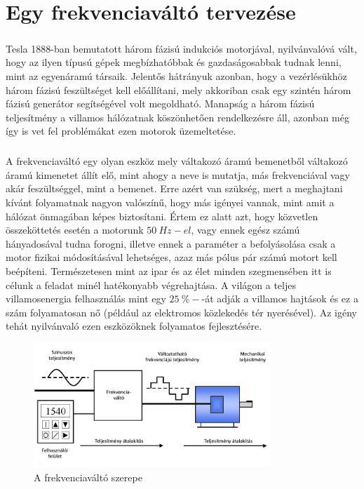 \chapter{Egy frekvenciaváltó tervezése}

\paragraph{}
Tesla 1888-ban bemutatott három fázisú indukciós motorjával, nyilvánvalóvá vált, hogy az ilyen típusú gépek megbízhatóbbak és gazdaságosabbak tudnak lenni, mint az egyenáramú társaik. Jelentős hátrányuk azonban, hogy a vezérlésükhöz három fázisú feszültséget kell előállítani, mely akkoriban csak egy szintén három fázisú generátor segítségével volt megoldható. Manapság a három fázisú teljesítmény a villamos hálózatnak köszönhetően rendelkezésre áll, azonban még így is vet fel problémákat ezen motorok üzemeltetése.

\paragraph{}
A frekvenciaváltó egy olyan eszköz mely váltakozó áramú bemenetből váltakozó áramú kimenetet állít elő, mint ahogy a neve is mutatja, más frekvenciával vagy akár feszültséggel, mint a bemenet. Erre azért van szükség, mert a meghajtani kívánt folyamatnak nagyon valószínű, hogy más igényei vannak, mint amit a hálózat önmagában képes biztosítani. Értem ez alatt azt, hogy közvetlen összeköttetés esetén a motorunk $50\ Hz-el$, vagy ennek egész számú hányadosával tudna forogni, illetve ennek a paraméter a befolyásolása csak a motor fizikai módosításával lehetséges, azaz más pólus pár számú motort kell beépíteni. Természetesen mint az ipar és az élet minden szegmensében itt is célunk a feladat minél hatékonyabb végrehajtása. A világon a teljes villamosenergia felhasználás mint egy $25\ \%-$-át adják a villamos hajtások és ez a szám folyamatosan nő (például az elektromos közlekedés tér nyerésével). Az igény tehát nyilvánvaló ezen eszközöknek folyamatos fejlesztésére.

\begin{figure}[!h]
	\centering
	\includegraphics[width = 0.8\textwidth]{figures/VFD_System.jpg}
	\caption{A frekvenciaváltó szerepe} 
	\label{fig:vfd_system}
\end{figure}

